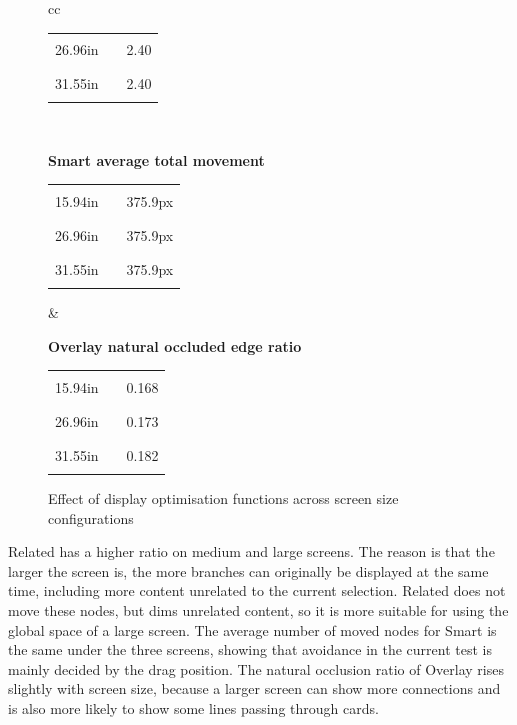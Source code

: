 \documentclass[11pt,a4paper,oneside,extrafontsizes]{memoir}
\begin{document}
\begin{center}
\begin{figure}[htbp]
\begin{tabular}{cc}
\begin{minipage}[t]{0.46\textwidth}
\begin{tabular}{@{}r l r@{}}
26.96in & \textcolor{blue!70!black}{\rule{0.2000\textwidth}{1.1ex}} & 2.40 \\
31.55in & \textcolor{blue!70!black}{\rule{0.2000\textwidth}{1.1ex}} & 2.40 \\
\end{tabular}
\end{minipage} \\[1.2em]
\begin{minipage}[t]{0.46\textwidth}
\centering
\textbf{Smart average total movement}\\[-0.2em]
\begin{tabular}{@{}r l r@{}}
15.94in & \textcolor{blue!70!black}{\rule{0.2000\textwidth}{1.1ex}} & 375.9px \\
26.96in & \textcolor{blue!70!black}{\rule{0.2000\textwidth}{1.1ex}} & 375.9px \\
31.55in & \textcolor{blue!70!black}{\rule{0.2000\textwidth}{1.1ex}} & 375.9px \\
\end{tabular}
\end{minipage}
&
\begin{minipage}[t]{0.46\textwidth}
\centering
\textbf{Overlay natural occluded edge ratio}\\[-0.2em]
\begin{tabular}{@{}r l r@{}}
15.94in & \textcolor{blue!70!black}{\rule{0.1843\textwidth}{1.1ex}} & 0.168 \\
26.96in & \textcolor{blue!70!black}{\rule{0.1901\textwidth}{1.1ex}} & 0.173 \\
31.55in & \textcolor{blue!70!black}{\rule{0.2000\textwidth}{1.1ex}} & 0.182 \\
\end{tabular}
\end{minipage}
\end{tabular}
\caption{Effect of display optimisation functions across screen size configurations}
\label{fig:display-screen-metrics}
\end{figure}

\end{center}

Related has a higher ratio on medium and large screens. The reason is that the larger the screen is, the more branches can originally be displayed at the same time, including more content unrelated to the current selection. Related does not move these nodes, but dims unrelated content, so it is more suitable for using the global space of a large screen. The average number of moved nodes for Smart is the same under the three screens, showing that avoidance in the current test is mainly decided by the drag position. The natural occlusion ratio of Overlay rises slightly with screen size, because a larger screen can show more connections and is also more likely to show some lines passing through cards.
\end{document}

